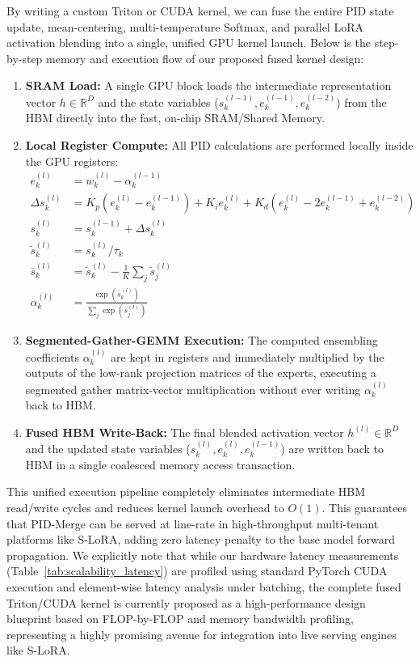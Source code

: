 By writing a custom Triton or CUDA kernel, we can fuse the entire PID state update, mean-centering, multi-temperature Softmax, and parallel LoRA activation blending into a single, unified GPU kernel launch. Below is the step-by-step memory and execution flow of our proposed fused kernel design:
\begin{enumerate}
    \item \textbf{SRAM Load:} A single GPU block loads the intermediate representation vector $h \in \mathbb{R}^D$ and the state variables ($s_k^{(l-1)}, e_k^{(l-1)}, e_k^{(l-2)}$) from the HBM directly into the fast, on-chip SRAM/Shared Memory.
    \item \textbf{Local Register Compute:} All PID calculations are performed locally inside the GPU registers:
    \begin{align}
    e_k^{(l)} &= w_k^{(l)} - \alpha_k^{(l-1)} \\
    \Delta s_k^{(l)} &= K_p (e_k^{(l)} - e_k^{(l-1)}) + K_i e_k^{(l)} + K_d (e_k^{(l)} - 2e_k^{(l-1)} + e_k^{(l-2)}) \\
    s_k^{(l)} &= s_k^{(l-1)} + \Delta s_k^{(l)} \\
    \tilde{s}_k^{(l)} &= s_k^{(l)} / \tau_k \\
    \bar{s}_k^{(l)} &= \tilde{s}_k^{(l)} - \frac{1}{K}\sum_j \tilde{s}_j^{(l)} \\
    \alpha_k^{(l)} &= \frac{\exp(\bar{s}_k^{(l)})}{\sum_j \exp(\bar{s}_j^{(l)})}
    \end{align}
    \item \textbf{Segmented-Gather-GEMM Execution:} The computed ensembling coefficients $\alpha_k^{(l)}$ are kept in registers and immediately multiplied by the outputs of the low-rank projection matrices of the experts, executing a segmented gather matrix-vector multiplication without ever writing $\alpha_k^{(l)}$ back to HBM.
    \item \textbf{Fused HBM Write-Back:} The final blended activation vector $h^{(l)} \in \mathbb{R}^D$ and the updated state variables ($s_k^{(l)}, e_k^{(l)}, e_k^{(l-1)}$) are written back to HBM in a single coalesced memory access transaction.
\end{enumerate}

This unified execution pipeline completely eliminates intermediate HBM read/write cycles and reduces kernel launch overhead to $O(1)$. This guarantees that PID-Merge can be served at line-rate in high-throughput multi-tenant platforms like S-LoRA, adding zero latency penalty to the base model forward propagation. We explicitly note that while our hardware latency measurements (Table~\ref{tab:scalability_latency}) are profiled using standard PyTorch CUDA execution and element-wise latency analysis under batching, the complete fused Triton/CUDA kernel is currently proposed as a high-performance design blueprint based on FLOP-by-FLOP and memory bandwidth profiling, representing a highly promising avenue for integration into live serving engines like S-LoRA.

